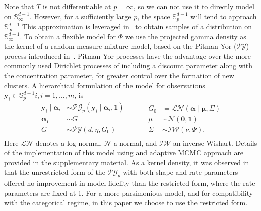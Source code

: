 Note that $T$ is not differentiable at $p = \infty$, so we can not use it to directly 
    model on ${\mathbb S}_{\infty}^{d-1}$. However, for a sufficiently large $p$, 
    the space ${\mathbb S}_p^{d-1}$ will tend to approach $\mathbb{S}_{\infty}^{d-1}$
    This approximation is leveraged in~\cite{trubey:pg} to obtain samples of a 
    distribution on ${\mathbb S}_{\infty}^{d-1}$. To obtain a flexible model for $\Phi$ we
    use the projected gamma density as the kernel of a random measure mixture
    model, based on the Pitman Yor ($\mathcal{PY}$) process introduced in~\cite{perman1992}.
    Pitman Yor processes have the advantage over the more commonly used Dirichlet 
    processes \citep{Ferguson74} of including a discount parameter along with the 
    concentration parameter, for greater control over the formation of 
    new clusters.  A hierarchical formulation of the model for observations 
    $\bm{y}_i\in \mathbb{S}_{p}^{d-1}i, i=1, \ldots,m$, is
    \begin{equation}
        \label{eqn:modelsphere}
        \begin{aligned}
        \bm{y}_i \mid \bm{\alpha}_i &\sim \mathcal{PG}_p
                \left(\bm{y}_i\mid\bm{\alpha}_i, \bm{1}\right)\\
        \bm{\alpha_i} &\sim G\\
        G &\sim \mathcal{PY}\left(d, \eta, G_0\right)\\
        \end{aligned}
        ~\hspace{1cm}
        \begin{aligned}
        G_0 &= \mathcal{LN}\left(\bm{\alpha}\mid\bm{\mu},\Sigma\right)\\
        \mu &\sim \mathcal{N}\left(\bm{0},\bm{1}\right)\\
        \Sigma &\sim \mathcal{IW}\left(\nu, \Psi\right).
        \end{aligned}
    \end{equation}
    Here $\mathcal{LN}$ denotes a log-normal, $\mathcal{N}$ a normal, and 
    $\mathcal{IW}$ an inverse Wishart. Details of the implementation of this model 
    using and adaptive MCMC approach are provided in the supplementary material.  
    As a kernel density, it was observed in \cite{trubey:pg} that the unrestricted 
    form of the $\mathcal{PG}_p$
    with both shape and rate parameters offered no improvement in model fidelity than
    the restricted form, where the rate parameters are fixed at 1.  For a more parsimonious
    model, and for compatibility with the categorical regime, in this paper we choose to use
    the restricted form.
    
